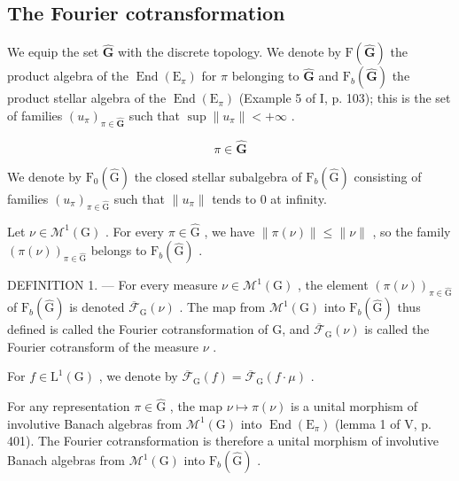 \subsection{The Fourier cotransformation}

We equip the set \(\widehat{\mathbf{G}}\) with the discrete topology. We denote by \(\mathrm{F}(\widehat{\mathbf{G}})\) the product algebra of the \(\operatorname{End}(\mathrm{E}_{\pi})\) for \(\pi\) belonging to \(\widehat{\mathbf{G}}\) and \(\mathrm{F}_b(\widehat{\mathbf{G}})\) the product stellar algebra of the \(\operatorname{End}(\mathrm{E}_{\pi})\) (Example 5 of I, p. 103); this is the set of families \((u_{\pi})_{\pi \in \widehat{\mathbf{G}}}\) such that \(\sup \| u_{\pi} \| < +\infty\) .

\[
\pi \in \widehat {\mathbf {G}}
\]

We denote by \(\mathrm{F}_{0}(\widehat{\mathrm{G}})\) the closed stellar subalgebra of \(\mathrm{F}_{b}(\widehat{\mathrm{G}})\) consisting of families \((u_{\pi})_{\pi\in\widehat{\mathrm{G}}}\) such that \(\|u_{\pi}\|\) tends to 0 at infinity.

Let \(\nu \in \mathcal{M}^1 (\mathrm{G})\) . For every \(\pi \in \widehat{\mathrm{G}}\) , we have \(\| \pi (\nu)\| \leqslant \| \nu \|\) , so the family \((\pi (\nu))_{\pi \in \widehat{\mathrm{G}}}\) belongs to \(\mathrm{F}_b(\widehat{\mathrm{G}})\) .

DEFINITION 1. --- For every measure \(\nu \in \mathcal{M}^{1}(\mathrm{G})\) , the element \((\pi (\nu))_{\pi \in \widehat{\mathrm{G}}}\) of \(\mathrm{F}_b(\widehat{\mathrm{G}})\) is denoted \(\overline{\mathcal{F}}_{\mathrm{G}}(\nu)\) . The map from \(\mathcal{M}^1 (\mathrm{G})\) into \(\mathrm{F}_b(\widehat{\mathrm{G}})\) thus defined is called the Fourier cotransformation of G, and \(\overline{\mathcal{F}}_{\mathrm{G}}(\nu)\) is called the Fourier cotransform of the measure \(\nu\) .

For \(f \in \mathrm{L}^1(\mathrm{G})\) , we denote by \(\overline{\mathcal{F}}_{\mathrm{G}}(f) = \overline{\mathcal{F}}_{\mathrm{G}}(f \cdot \mu)\) .

For any representation \(\pi \in \widehat{\mathrm{G}}\) , the map \(\nu \mapsto \pi(\nu)\) is a unital morphism of involutive Banach algebras from \(\mathcal{M}^{1}(\mathrm{G})\) into \(\operatorname{End}(\mathrm{E}_{\pi})\) (lemma 1 of V, p. 401). The Fourier cotransformation is therefore a unital morphism of involutive Banach algebras from \(\mathcal{M}^{1}(\mathrm{G})\) into \(\mathrm{F}_b(\widehat{\mathrm{G}})\) .

